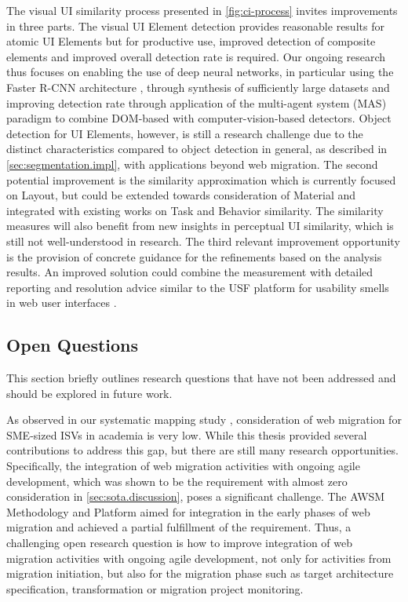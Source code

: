 The visual UI similarity process presented in \cref{fig:ci-process} invites improvements in three parts.
The visual UI Element detection provides reasonable results for atomic UI Elements but for productive use, improved detection of composite elements and improved overall detection rate is required.
Our ongoing research thus focuses on enabling the use of deep neural networks, in particular using the Faster R-CNN architecture \autocite{Ren2017Faster-RCNN}, through synthesis of sufficiently large datasets and improving detection rate through application of the multi-agent system (MAS) paradigm to combine DOM-based with computer-vision-based detectors.
Object detection for UI Elements, however, is still a research challenge due to the distinct characteristics compared to object detection in general, as described in \cref{sec:segmentation.impl}, with applications beyond web migration.
The second potential improvement is the similarity approximation which is currently focused on Layout, but could be extended towards consideration of Material and integrated with existing works on Task and Behavior similarity.
The similarity measures will also benefit from new insights in perceptual UI similarity, which is still not well-understood in research.
The third relevant improvement opportunity is the provision of concrete guidance for the refinements based on the analysis results.
An improved solution could combine the measurement with detailed reporting and resolution advice similar to the USF platform for usability smells in web user interfaces \autocite{Grigera2017}.

\hypertarget{open-questions}{%
\subsection{Open Questions}\label{open-questions}}

This section briefly outlines research questions that have not been addressed and should be explored in future work.

As observed in our systematic mapping study \autocite{Heil2017Survey}, consideration of web migration for SME-sized ISVs in academia is very low.
While this thesis provided several contributions to address this gap, but there are still many research opportunities.
Specifically, the integration of web migration activities with ongoing agile development, which was shown to be the requirement with almost zero consideration in \cref{sec:sota.discussion}, poses a significant challenge.
The AWSM Methodology and Platform aimed for integration in the early phases of web migration and achieved a partial fulfillment of the requirement.
Thus, a challenging open research question is how to improve integration of web migration activities with ongoing agile development, not only for activities from migration initiation, but also for the migration phase such as target architecture specification, transformation or migration project monitoring.

